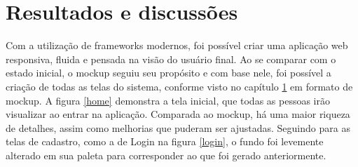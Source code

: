 \chapter{Resultados e discussões}\label{chp:LABEL_CHP_5}
\label{resultados}
Com a utilização de frameworks modernos, foi possível criar uma aplicação web responsiva, fluida e pensada na visão do usuário final. Ao se comparar com o estado inicial, o mockup seguiu seu propósito e com base nele, foi possível a criação de todas as telas do sistema, conforme visto no capítulo \ref{chp:LABEL_CHP_5} em formato de mockup. A figura \ref{home} demonstra a tela inicial, que todas as pessoas irão visualizar ao entrar na aplicação. Comparada ao mockup, há uma maior riqueza de detalhes, assim como melhorias que puderam ser ajustadas. Seguindo para as telas de cadastro, como a de Login na figura \ref{login}, o fundo foi levemente alterado em sua paleta para corresponder ao que foi gerado anteriormente. 


